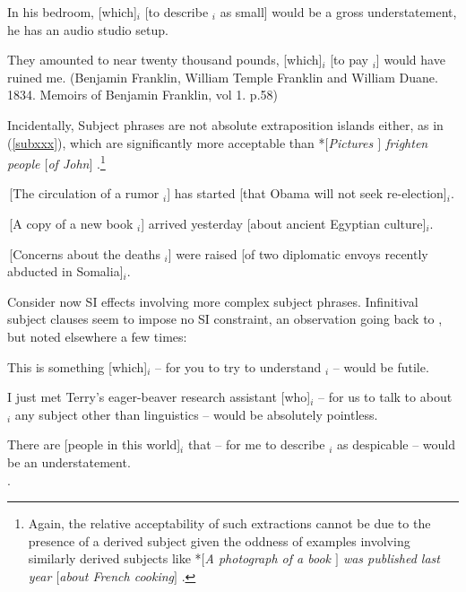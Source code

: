 \documentclass[output=paper]{langsci/langscibook}
\begin{document}
\ex In his bedroom, [which]$_i$ [to describe \spc$_i$ as small] would be
 a gross understatement, he has an audio studio setup.

 \ex
 They amounted to near twenty thousand pounds, [which]$_i$ [to pay \spc$_i$] would have ruined me. 
(Benjamin Franklin, William Temple
Franklin and  William Duane.
1834.  Memoirs of Benjamin Franklin, vol 1. 
p.58)
\z \label{vpsia}
\z 




Incidentally, Subject phrases are not absolute extraposition islands either, as in (\ref{subxxx}),
which  are significantly  more acceptable than  *\emph{$[$Pictures \spc$]$ frighten people $[$of John$]$}  \citep{drummond}.\footnote{Again, the relative acceptability of such extractions
cannot be due to the presence of a derived subject given the oddness
of examples involving similarly derived subjects  like  *\emph{$[$A photograph of a book \spc$]$ was published last year $[$about French cooking$]$} \citep{akma75}.}




\ea
\ea
\,[The circulation of a rumor \spc$_i$]
has started [that Obama will not seek re-election]$_i$.

\item \,[A  copy of a new book \spc$_i$] arrived
yesterday [about ancient Egyptian culture]$_i$.

\item \,[Concerns about the deaths  \spc$_i$] were
raised [of two diplomatic envoys recently abducted in Somalia]$_i$.
\z \label{subxxx}
\z


Consider now SI effects involving more complex subject phrases.
Infinitival subject clauses seem to impose no SI constraint, an observation going
back to \citet{kunotakamib}, but noted elsewhere a few times:

\ea
\ea This is something [which]$_i$  -- for you to try to understand \spc$_i$ -- would be futile.\\
\citep[49]{kunotakamib}

\ex I just met Terry's eager-beaver research assistant [who]$_i$ -- for us
to talk to about \spc$_i$ any subject other than linguistics -- would be absolutely pointless.\\
\citep[265]{levhubook}

\item There are [people in this world]$_i$ that --  for me to describe \spc$_i$ as despicable 
 -- would be an understatement.\\
 \citep[471]{chavesextr}.
\end{document}
